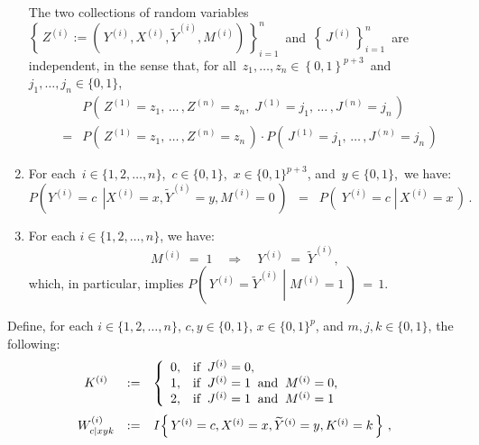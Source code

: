 \begin{theorem}
\begin{enumerate}
	The two collections of random variables
	\,$\left\{\,Z^{(i)} := \left(\,Y^{(i)},X^{(i)},\widetilde{Y}^{(i)},M^{(i)}\right)\,\right\}_{i=1}^{n}$\,
	and
	\,$\left\{\,J^{(i)}\,\right\}_{i=1}^{n}$\,
	are independent, in the sense that, for all
	\,$z_{1}, \ldots, z_{n} \in \left\{0,1\right\}^{p+3}$\, and \,$j_{1}, \ldots, j_{n} \in \{0,1\}$,\,
	\begin{eqnarray*}
	&&
		P\!\left(\,Z^{(1)}=z_{1},\,\ldots\,,Z^{(n)}=z_{n},\;J^{(1)}=j_{1},\,\ldots\,,J^{(n)}=j_{n}\,\right)
	\\
	& = &
		P\!\left(\,Z^{(1)}=z_{1},\,\ldots\,,Z^{(n)}=z_{n}\,\right)
		\cdot
		P\!\left(\,J^{(1)}=j_{1},\,\ldots\,,J^{(n)}=j_{n}\,\right)
	\end{eqnarray*}
\item\label{MzeroImplies}
	For each \,$i\in\{1,2,\ldots,n\}$, \,$c\in\{0,1\}$, \,$x \in \{0,1\}^{p+3}$, and \,$y \in \{0,1\}$, \,we have:
	\begin{equation*}
	P\!\left(\left.Y^{(i)} = c\,\;\right\vert X^{(i)}=x,\widetilde{Y}^{(i)}=y,M^{(i)}=0\,\right)
	\;\; = \;\;
	P\!\left(\;Y^{(i)} = c\;\left\vert\,X^{(i)}=x\right.\,\right)\,.
	\end{equation*}
\item\label{MoneImpliesCEqualsY}
	For each $i\in\{1,2,\ldots,n\}$, we have:
	\begin{equation*}
	M^{(i)} \; = \; 1
	\quad\Longrightarrow\quad
	Y^{(i)} \; = \; \widetilde{Y}^{(i)},
	\end{equation*}
	which, in particular, implies $P\!\left(\,\left.Y^{(i)} = \widetilde{Y}^{(i)}\;\right\vert\;M^{(i)}=1\,\right)\,=\,1$.
\end{enumerate}
\renewcommand{\theenumi}{\roman{enumi}}
\renewcommand{\labelenumi}{\textnormal{(\theenumi)}$\;\;$}
Define, for each
\;$i \in \{1,2,\ldots,n\}$,
\;$c,y \in \{0,1\}$,
\;$x \in \{0,1\}^{p}$,
\;and
\;$m,j,k \in \{0,1\}$,
\;the following:
\begin{equation*}
\begin{array}{ccll}
	K^{(i)}
		&:=&
		\left\{\begin{array}{cl}
		0, & \textnormal{if}\;\; J^{(i)} = 0,
		\\
		1, & \textnormal{if}\;\; J^{(i)} = 1 \;\;\textnormal{and}\;\; M^{(i)} = 0,
		\\
		2, & \textnormal{if}\;\; J^{(i)} = 1 \;\;\textnormal{and}\;\; M^{(i)} = 1
		\end{array}\right.
	\\
	W^{(i)}_{c \vert xyk}
		&:=&
		\overset{\textnormal{\large\color{white}1}}{I}\!\left\{\,Y^{(i)}=c,X^{(i)}=x,\widetilde{Y}^{(i)}=y,K^{(i)}=k\,\right\}\,,

\end{array}
\end{equation*}
\end{theorem}
